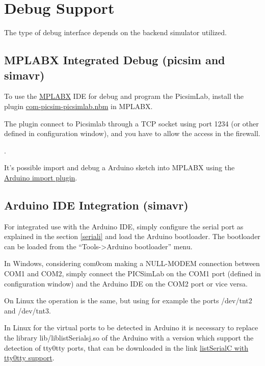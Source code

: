 
\chapter{Debug Support}

The type of debug interface depends on the backend simulator utilized.


\section{MPLABX Integrated Debug (picsim and simavr) \label{mplaxd}}

To use the \href{http://www.microchip.com/mplabx}{MPLABX} IDE for debug and program the PicsimLab, install the plugin \href{https://github.com/lcgamboa/picsimlab_md/releases/}{com-picsim-picsimlab.nbm} in MPLABX.

The plugin connect to Picsimlab through a TCP socket using port 1234 (or other defined in configuration window), and you have to allow the access in the firewall.

.

It's possible import and debug a Arduino sketch into MPLABX using the \href{https://github.com/janegilruud/chipKIT-importer-2.0}{Arduino import plugin}.

\section{Arduino IDE Integration (simavr) }

For integrated use with the Arduino IDE, simply configure the serial port as explained in the section \ref{seriali} and load the Arduino bootloader. The bootloader can be loaded from the ``Tools->Arduino bootloader'' menu.

In Windows, considering com0com making a NULL-MODEM connection between COM1 and COM2, simply connect the PICSimLab on the COM1 port (defined in configuration window) and the Arduino IDE on the COM2 port or vice versa.

On Linux the operation is the same, but using for example the ports /dev/tnt2 and /dev/tnt3.

In Linux for the virtual ports to be detected in Arduino it is necessary to replace the library lib/liblistSerialsj.so of the Arduino with a version which support the detection of tty0tty ports, that can be downloaded in the link \href{https://github.com/lcgamboa/listSerialPortsC/releases} {listSerialC with tty0tty support}.


